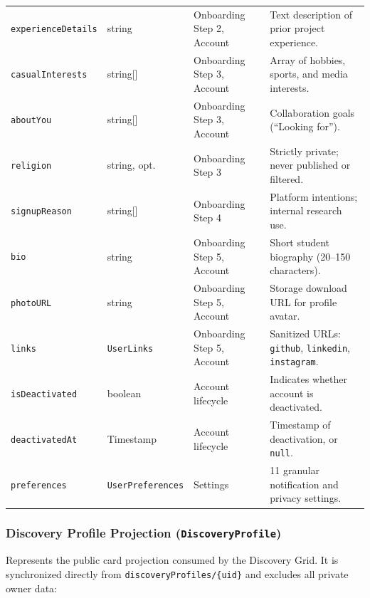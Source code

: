 \documentclass[11pt,letterpaper]{article}
\begin{document}
\begin{table}[h!]
\begin{tabularx}{\textwidth}{p{3.3cm} p{1.8cm} p{3.0cm} Y}
\texttt{experienceDetails} & string & Onboarding Step 2, Account & Text description of prior project experience. \\
\texttt{casualInterests} & string[] & Onboarding Step 3, Account & Array of hobbies, sports, and media interests. \\
\texttt{aboutYou} & string[] & Onboarding Step 3, Account & Collaboration goals (``Looking for''). \\
\texttt{religion} & string, opt. & Onboarding Step 3 & Strictly private; never published or filtered. \\
\texttt{signupReason} & string[] & Onboarding Step 4 & Platform intentions; internal research use. \\
\texttt{bio} & string & Onboarding Step 5, Account & Short student biography (20--150 characters). \\
\texttt{photoURL} & string & Onboarding Step 5, Account & Storage download URL for profile avatar. \\
\texttt{links} & \texttt{UserLinks} & Onboarding Step 5, Account & Sanitized URLs: \texttt{github}, \texttt{linkedin}, \texttt{instagram}. \\
\texttt{isDeactivated} & boolean & Account lifecycle & Indicates whether account is deactivated. \\
\texttt{deactivatedAt} & Timestamp & Account lifecycle & Timestamp of deactivation, or \texttt{null}. \\
\texttt{preferences} & \texttt{UserPreferences} & Settings & 11 granular notification and privacy settings. \\
\bottomrule
\end{tabularx}
\end{table}

\subsubsection*{Discovery Profile Projection (\texttt{DiscoveryProfile})}
Represents the public card projection consumed by the Discovery Grid. It is synchronized directly from \texttt{discoveryProfiles/}\allowbreak\texttt{\{uid\}} and excludes all private owner data:
\end{document}
